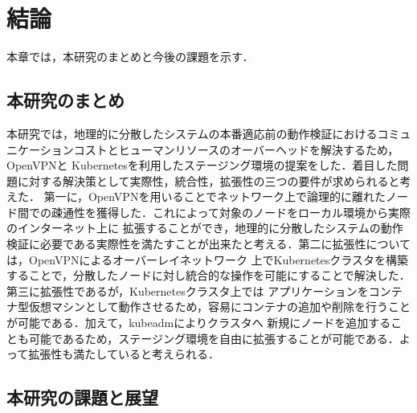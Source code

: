 \chapter{結論}
\label{conclusion}

本章では，本研究のまとめと今後の課題を示す．

\section{本研究のまとめ}
\label{conclusion:conclusion}
本研究では，地理的に分散したシステムの本番適応前の動作検証におけるコミュニケーションコストとヒューマンリソースのオーバーヘッドを解決するため，OpenVPNと
Kubernetesを利用したステージング環境の提案をした．着目した問題に対する解決策として実際性，統合性，拡張性の三つの要件が求められると考えた．
第一に，OpenVPNを用いることでネットワーク上で論理的に離れたノード間での疎通性を獲得した．これによって対象のノードをローカル環境から実際のインターネット上に
拡張することができ，地理的に分散したシステムの動作検証に必要である実際性を満たすことが出来たと考える．第二に拡張性については，OpenVPNによるオーバーレイネットワーク
上でKubernetesクラスタを構築することで，分散したノードに対し統合的な操作を可能にすることで解決した．第三に拡張性であるが，Kubernetesクラスタ上では
アプリケーションをコンテナ型仮想マシンとして動作させるため，容易にコンテナの追加や削除を行うことが可能である．加えて，kubeadmによりクラスタへ
新規にノードを追加することも可能であるため，ステージング環境を自由に拡張することが可能である．よって拡張性も満たしていると考えられる．

\section{本研究の課題と展望}
\label{conclusion:issue}

